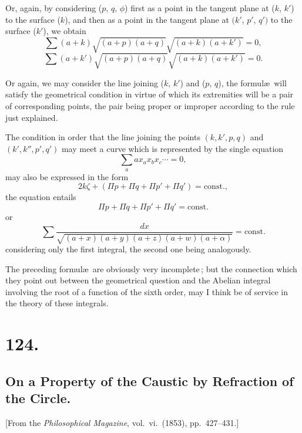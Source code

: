 \documentclass[11pt,a4paper]{book}
\begin{document}
\medskip

Or, again, by considering ($p$, $q$, $\phi$) first as a point in the tangent plane at
($k$, $k'$) to the surface ($k$), and then as a point in the tangent plane at $(k'$, $p'$, $q')$
to the surface ($k'$), we obtain
\[
\sum (a+k)\sqrt{(a+p)(a+q)}\sqrt{(a+k)(a+k')} = 0,
\]
\[
\sum (a+k')\sqrt{(a+p)(a+q)}\sqrt{(a+k)(a+k')} = 0.
\]

\medskip

Or again, we may consider the line joining ($k$, $k'$) and ($p$, $q$), the formul\ae\ will satisfy the geometrical condition in virtue of which its extremities
will be a pair of corresponding points, the pair being proper or improper according
to the rule just explained.

\medskip

\noindent The condition in order that the line joining the points $(k, k', p, q)$ and $(k', k'', p', q')$
may meet a curve which is represented by the single equation
\[
\sum_a a x_a x_b x_c \cdots = 0,
\]
may also be expressed in the form
\[
2k\zeta + (\Pi p + \Pi q + \Pi p' + \Pi q') = \mathrm{const.},
\]
the equation entails
\[
\Pi p + \Pi q + \Pi p' + \Pi q' = \mathrm{const.}
\]
or
\[
\sum \frac{dx}{\sqrt{(a+x)(a+y)(a+z)(a+w)(a+\alpha)}} = \mathrm{const.}
\]
considering only the first integral, the second one being analogously.

\medskip

The preceding formul\ae\ are obviously very incomplete\,; but the connection
which they point out between the geometrical question and the Abelian integral
involving the root of a function of the sixth order, may I think be of service in
the theory of these integrals.

\section*{124.}
\subsection*{On a Property of the Caustic by Refraction of the Circle.}

[From the \textit{Philosophical Magazine}, vol.\ vi.\ (1853), pp.\ 427--431.]

\medskip
\end{document}
